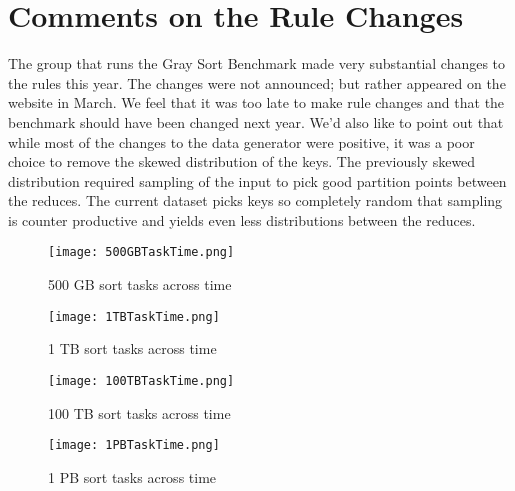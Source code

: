 \documentclass{article}
\begin{document}
\section{Comments on the Rule Changes}

The group that runs the Gray Sort Benchmark made very substantial
changes to the rules this year. The changes were not announced; but
rather appeared on the website in March. We feel that it was too late
to make rule changes and that the benchmark should have been changed
next year. We'd also like to point out that while most of the changes to
the data generator were positive, it was a poor choice to remove the
skewed distribution of the keys. The previously skewed distribution
required sampling of the input to pick good partition points between
the reduces. The current dataset picks keys so completely random that
sampling is counter productive and yields even less distributions between the
reduces.




\begin{figure}[!p]
\texttt{[image: 500GBTaskTime.png]}
\caption{500 GB sort tasks across time}\label{500GbTimeline}
\end{figure} 

\begin{figure}[!p]
\texttt{[image: 1TBTaskTime.png]}
\caption{1 TB sort tasks across time}\label{1TbTimeline}
\end{figure} 

\begin{figure}[!p]
\texttt{[image: 100TBTaskTime.png]}
\caption{100 TB sort tasks across time}\label{100TbTimeline}
\end{figure} 

\begin{figure}[!p]
\texttt{[image: 1PBTaskTime.png]}
\caption{1 PB sort tasks across time}\label{1PbTimeline}
\end{figure} 
\end{document}
